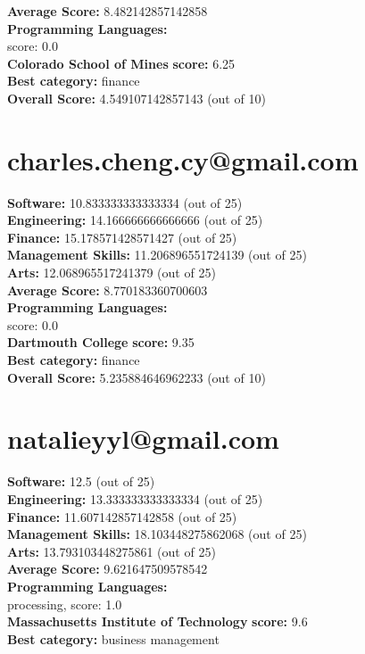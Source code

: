 \documentclass{article}
\begin{document}
\textbf{Average Score: } 8.482142857142858\\
\textbf{Programming Languages:} \\
score: 0.0\\
\textbf{Colorado School of Mines} \textbf{score:} 6.25\\
\textbf{Best category: } finance\\
\textbf{Overall Score: }4.549107142857143 (out of 10)\section{charles.cheng.cy@gmail.com}
\textbf{Software:} 10.833333333333334 (out of 25)\\
\textbf{Engineering: } 14.166666666666666 (out of 25)\\
\textbf{Finance:} 15.178571428571427 (out of 25)\\
\textbf{Management Skills:} 11.206896551724139 (out of 25)\\
\textbf{Arts:} 12.068965517241379 (out of 25)\\
\textbf{Average Score: } 8.770183360700603\\
\textbf{Programming Languages:} \\
score: 0.0\\
\textbf{Dartmouth College} \textbf{score:} 9.35\\
\textbf{Best category: } finance\\
\textbf{Overall Score: }5.235884646962233 (out of 10)\section{natalieyyl@gmail.com}
\textbf{Software:} 12.5 (out of 25)\\
\textbf{Engineering: } 13.333333333333334 (out of 25)\\
\textbf{Finance:} 11.607142857142858 (out of 25)\\
\textbf{Management Skills:} 18.103448275862068 (out of 25)\\
\textbf{Arts:} 13.793103448275861 (out of 25)\\
\textbf{Average Score: } 9.621647509578542\\
\textbf{Programming Languages:} \\
processing, score: 1.0\\
\textbf{Massachusetts Institute of Technology} \textbf{score:} 9.6\\
\textbf{Best category: } business management\\
\end{document}
